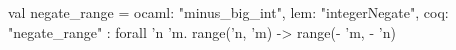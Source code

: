 val negate_range = {ocaml: "minus_big_int", lem: "integerNegate", coq: "negate_range"} : forall 'n 'm. range('n, 'm) -> range(- 'm, - 'n)
